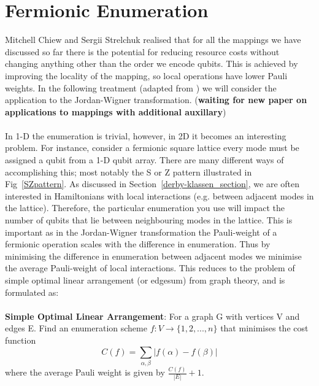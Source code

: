 \documentclass[twoside]{article}
\begin{document}
               \section{Fermionic Enumeration}\label{fermionic-enumeration_section}
               Mitchell Chiew and Sergii Strelchuk \cite{fermionicEncoding} realised that for all the mappings we have discussed so far there is the potential for reducing resource costs without changing anything other than the order we encode qubits. This is achieved by improving the locality of the mapping, so local operations have lower Pauli weights. In the following treatment (adapted from \cite{fermionicEncoding}) we will consider the application to the Jordan-Wigner transformation. (\textbf{waiting for new paper on applications to mappings with additional auxillary})\\\\
               In 1-D the enumeration is trivial, however, in 2D it becomes an interesting problem. For instance, consider a fermionic square lattice every mode must be assigned a qubit from a 1-D qubit array. There are many different ways of accomplishing this; most notably the S or Z pattern illustrated in Fig~\ref{SZpattern}. As discussed in Section~\ref{derby-klassen_section}, we are often interested in Hamiltonians with local interactions (e.g. between adjacent modes in the lattice). Therefore, the particular enumeration you use will impact the number of qubits that lie between neighbouring modes in the lattice. This is important as in the Jordan-Wigner transformation the Pauli-weight of a fermionic operation scales with the difference in enumeration. Thus by minimising the difference in enumeration between adjacent modes we minimise the average Pauli-weight of local interactions. This reduces to the problem of simple optimal linear arrangement (or edgesum) \cite{edgesum} from graph theory, and is formulated as:\\\\
               \textbf{Simple Optimal Linear Arrangement}: For a graph G with vertices V and edges E. Find an enumeration scheme $f: V \rightarrow \{1,2,...,n\}$ that minimises the cost function
               \begin{equation}
                       C(f) = \sum_{\alpha, \beta} |f(\alpha) - f(\beta)|
               \end{equation}
               where the average Pauli weight is given by $\frac{C(f)}{|E|} +1$.\\\\
\end{document}

